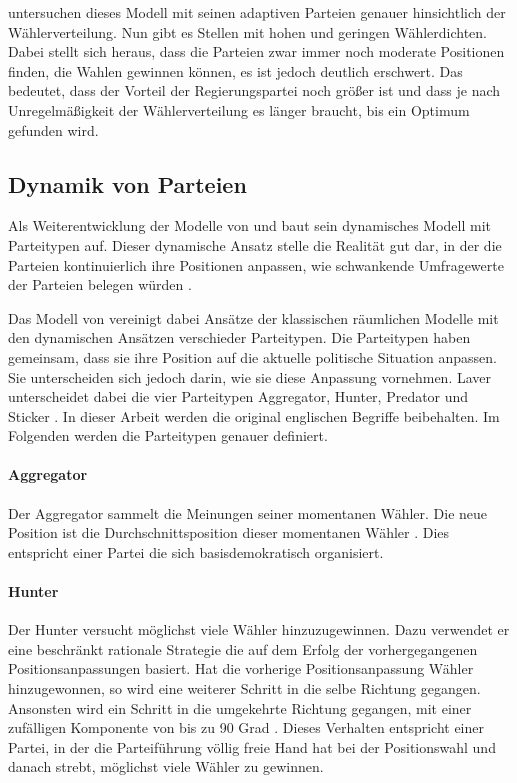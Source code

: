 \citet{kollman1998political} untersuchen dieses Modell mit seinen adaptiven Parteien genauer hinsichtlich der Wählerverteilung. Nun gibt es Stellen mit hohen und geringen Wählerdichten. Dabei stellt sich heraus, dass die Parteien zwar immer noch moderate Positionen finden, die Wahlen gewinnen können, es ist jedoch deutlich erschwert. Das bedeutet, dass der Vorteil der Regierungspartei noch größer ist und dass je nach Unregelmäßigkeit der Wählerverteilung es länger braucht, bis ein Optimum gefunden wird. \citep{kollman1998political}

\subsection{Dynamik von Parteien} \label{sec:ABM-Dynamik}

Als Weiterentwicklung der Modelle von \citet{kollman1992adaptive} und \citet{kollman1998political} baut \citet{laver2005policy} sein dynamisches Modell mit Parteitypen auf.
Dieser dynamische Ansatz stelle die Realität gut dar, in der die Parteien kontinuierlich ihre Positionen anpassen, wie schwankende Umfragewerte der Parteien belegen würden \citep[S.\,263-264]{laver2005policy}.

Das Modell von \citet{laver2005policy} vereinigt dabei Ansätze der klassischen räumlichen Modelle mit den dynamischen Ansätzen verschieder Parteitypen. Die Parteitypen haben gemeinsam, dass sie ihre Position auf die aktuelle politische Situation anpassen. Sie unterscheiden sich jedoch darin, wie sie diese Anpassung vornehmen. Laver unterscheidet dabei die vier Parteitypen Aggregator, Hunter, Predator und Sticker \citep[S.\,266-267]{laver2005policy}. In dieser Arbeit werden die original englischen Begriffe beibehalten. Im Folgenden werden die Parteitypen genauer definiert.

\paragraph{Aggregator} Der Aggregator sammelt die Meinungen seiner momentanen Wähler. Die neue Position ist die Durchschnittsposition dieser momentanen Wähler \citep[S.\,267]{laver2005policy}. Dies entspricht einer Partei die sich basisdemokratisch organisiert.

\paragraph{Hunter} Der Hunter versucht möglichst viele Wähler hinzuzugewinnen. Dazu verwendet er eine beschränkt rationale Strategie die auf dem Erfolg der vorhergegangenen Positionsanpassungen basiert. Hat die vorherige Positionsanpassung Wähler hinzugewonnen, so wird eine weiterer Schritt in die selbe Richtung gegangen. Ansonsten wird ein Schritt in die umgekehrte Richtung gegangen, mit einer zufälligen Komponente von bis zu 90 Grad \citep[S.\,267]{laver2005policy}. Dieses Verhalten entspricht einer Partei, in der die Parteiführung völlig freie Hand hat bei der Positionswahl und danach strebt, möglichst viele Wähler zu gewinnen.

